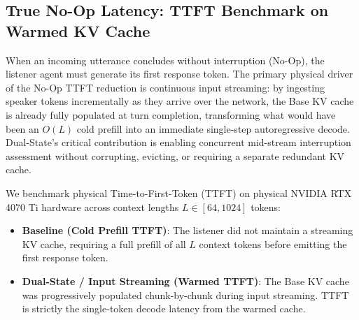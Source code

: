 \documentclass{article}
\begin{document}
\subsection{True No-Op Latency: TTFT Benchmark on Warmed KV Cache}
When an incoming utterance concludes without interruption (No-Op), the listener agent must generate its first response token. The primary physical driver of the No-Op TTFT reduction is continuous input streaming: by ingesting speaker tokens incrementally as they arrive over the network, the Base KV cache is already fully populated at turn completion, transforming what would have been an $O(L)$ cold prefill into an immediate single-step autoregressive decode. Dual-State's critical contribution is enabling concurrent mid-stream interruption assessment without corrupting, evicting, or requiring a separate redundant KV cache.

We benchmark physical Time-to-First-Token (TTFT) on physical NVIDIA RTX 4070 Ti hardware across context lengths $L \in [64, 1024]$ tokens:
\begin{itemize}
    \item \textbf{Baseline (Cold Prefill TTFT)}: The listener did not maintain a streaming KV cache, requiring a full prefill of all $L$ context tokens before emitting the first response token.
    \item \textbf{Dual-State / Input Streaming (Warmed TTFT)}: The Base KV cache was progressively populated chunk-by-chunk during input streaming. TTFT is strictly the single-token decode latency from the warmed cache.
\end{itemize}
\end{document}
